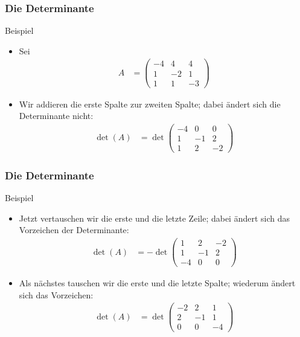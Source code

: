\documentclass{beamer}
\renewcommand{\ae}{\"a}
\newcommand{\mytitle}{Die Determinante}
\begin{document}
\begin{frame}\frametitle{\mytitle}
	\begin{block}{Beispiel}
		\begin{itemize}
			\item Sei
\begin{align*}
				A&=\begin{pmatrix}
					-4&4&4\\1&-2&1\\1&1&-3
				\end{pmatrix}
				\end{align*}
			\item Wir addieren die erste Spalte zur zweiten Spalte; dabei \ae ndert sich die Determinante nicht:
\begin{align*}
	\det(A)&=\det\begin{pmatrix}
					-4&0&0\\1&-1&2\\1&2&-2
				\end{pmatrix}
				\end{align*}
		\end{itemize}
	\end{block}
\end{frame}

\begin{frame}\frametitle{\mytitle}
	\begin{block}{Beispiel}
		\begin{itemize}
			\item Jetzt vertauschen wir die erste und die letzte Zeile; dabei \ae ndert sich das Vorzeichen der Determinante:
				\begin{align*}
					\det(A)&=-\det\begin{pmatrix} 1&2&-2\\1&-1&2\\-4&0&0 \end{pmatrix}
				\end{align*}
			\item Als n\ae chstes tauschen wir die erste und die letzte Spalte; wiederum \ae ndert sich das Vorzeichen:
				\begin{align*}
					\det(A)&=\det\begin{pmatrix} -2&2&1\\2&-1&1\\0&0&-4 \end{pmatrix}
				\end{align*}
		\end{itemize}
	\end{block}
\end{frame}
\end{document}
